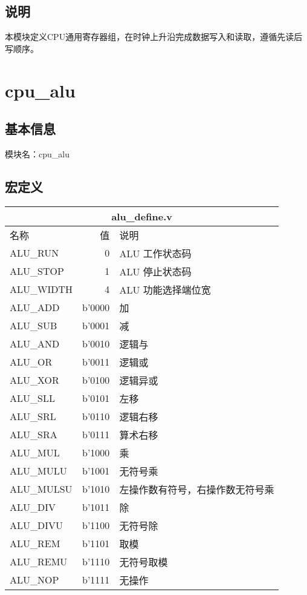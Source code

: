 \subsection{说明}
本模块定义CPU通用寄存器组，在时钟上升沿完成数据写入和读取，遵循先读后写顺序。

\section{cpu\_alu}
\subsection{基本信息}
模块名：cpu\_alu\\
\subsection{宏定义}
\begin{tabular}{|l|r|l|}
    \hline
    \multicolumn{3}{|c|}{alu\_define.v}\\\hline
    名称    &   值  &   说明\\\hline
    ALU\_RUN     &      0   &  ALU 工作状态码\\ \hline
    ALU\_STOP    &      1   &  ALU 停止状态码\\ \hline
    ALU\_WIDTH   &      4      &  ALU 功能选择端位宽\\ \hline
    ALU\_ADD     &   b'0000 &  加\\ \hline
    ALU\_SUB     &   b'0001 &  减\\ \hline
    ALU\_AND     &   b'0010 &  逻辑与\\ \hline
    ALU\_OR      &   b'0011 &  逻辑或\\ \hline
    ALU\_XOR     &   b'0100 &  逻辑异或\\ \hline
    ALU\_SLL     &   b'0101 &  左移\\ \hline
    ALU\_SRL     &   b'0110 &  逻辑右移\\ \hline
    ALU\_SRA     &   b'0111 &  算术右移\\ \hline
    ALU\_MUL     &   b'1000 &  乘\\ \hline
    ALU\_MULU    &   b'1001 &  无符号乘\\ \hline
    ALU\_MULSU   &   b'1010 &  左操作数有符号，右操作数无符号乘\\ \hline
    ALU\_DIV     &   b'1011 &  除\\ \hline
    ALU\_DIVU    &   b'1100 &  无符号除\\ \hline
    ALU\_REM     &   b'1101 &  取模\\ \hline
    ALU\_REMU    &   b'1110 &  无符号取模\\ \hline
    ALU\_NOP     &   b'1111 &  无操作\\ \hline
\end{tabular}
